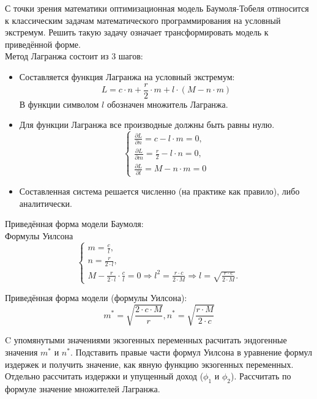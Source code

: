 \documentclass[12pt,a4paper]{article}
\begin{document}
С точки зрения математики оптимизационная модель Баумоля-Тобеля отпносится к классическим задачам математического программирования на условный экстремум. Решить такую задачу означает трансформировать модель к приведённой форме. \\

Метод Лагранжа состоит из 3 шагов:
\begin{itemize}
\item Составляется функция Лагранжа на условный экстремум:
\begin{equation}
L = c \cdot n + \frac{r}{2} \cdot m + l \cdot (M - n \cdot m)
\end{equation} 
В функции символом $l$ обозначен множитель Лагранжа.
\item Для функции Лагранжа все производные должны быть равны нулю. 
\begin{equation}
\begin{cases}
\displaystyle{\frac{\partial{L}}{\partial{n}}} = c - l \cdot m = 0, \\[10pt]
\displaystyle{\frac{\partial{L}}{\partial{m}}} = \frac{r}{2} - l \cdot n = 0,\\[10pt]
\displaystyle{\frac{\partial{L}}{\partial{l}}} = M - n \cdot m = 0
\end{cases}
\end{equation}
\item Составленная система решается численно (на практике как правило), либо аналитически.
\end{itemize}

Приведённая форма модели Баумоля:\\
Формулы Уилсона
\begin{equation}
\begin{cases}
m = \displaystyle{\frac{c}{l}}, \\[10pt]
n = \displaystyle{\frac{r}{2 \cdot l}}, \\[10pt]
M - \displaystyle{\frac{r}{2 \cdot l}} \cdot \displaystyle{\frac{c}{l}} = 0 \Rightarrow l^2 = \displaystyle{\frac{r \cdot c}{2 \cdot M}} \Rightarrow l = \sqrt{\displaystyle{\frac{r \cdot c}{2 \cdot M}}}.
\end{cases}
\end{equation}

Приведённая форма модели (формулы Уилсона):
\begin{equation}
m^*=\sqrt{\displaystyle{\frac{2 \cdot c \cdot M}{r}}}, n^*=\sqrt{\displaystyle{\frac{r \cdot M}{2 \cdot c}}}
\end{equation}

 C упомянутыми значениями экзогенных переменных расчитать эндогенные значения $m^*$ и $n^*$. Подставить правые части формул Уилсона в уравнение формул издержек и получить значение, как явную функцию экзогенных переменных. Отдельно рассчитать издержки и упущенный доход ($\phi_1$ и $\phi_2$). Рассчитать по формуле значение множителей Лагранжа. 
\end{document}
